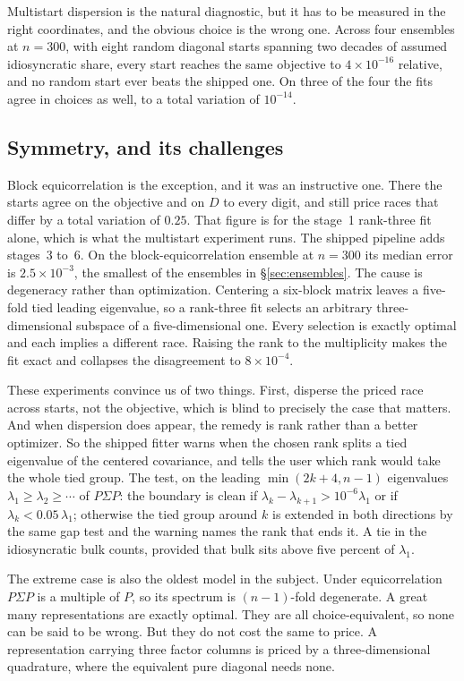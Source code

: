 \documentclass[11pt]{article}
\begin{document}
Multistart dispersion is the natural diagnostic, but it
has to be measured in the right coordinates, and the obvious choice is
the wrong one. Across four ensembles at $n=300$, with eight random diagonal starts
spanning two decades of assumed idiosyncratic share, every start reaches
the same objective to $4\times10^{-16}$ relative, and no random start
ever beats the shipped one. On three of the four the fits agree in
choices as well, to a total variation of $10^{-14}$.

\subsection{Symmetry, and its challenges}

Block equicorrelation is the exception, and it was an instructive one. There the
starts agree on the objective and on $D$ to every digit, and still price
races that differ by a total variation of $0.25$. That figure is for the
stage~1 rank-three fit alone, which is what the multistart experiment
runs. The shipped pipeline adds stages~3 to~6. On the
block-equicorrelation ensemble at $n=300$ its median error is
$2.5\times10^{-3}$, the smallest of the ensembles in
\S\ref{sec:ensembles}. The cause is degeneracy
rather than optimization. Centering a six-block matrix leaves a five-fold
tied leading eigenvalue, so a rank-three fit selects an arbitrary
three-dimensional subspace of a five-dimensional one. Every selection is
exactly optimal and each implies a different race. Raising the rank to
the multiplicity makes the fit exact and collapses the disagreement to
$8\times10^{-4}$.

These experiments convince us of two things. First, disperse the priced race across starts, not the objective, which is blind to precisely the case that matters. And when
dispersion does appear, the remedy is rank rather than a better
optimizer. So the shipped fitter warns when the chosen rank splits a tied
eigenvalue of the centered covariance, and tells the user which rank would take
the whole tied group. The test, on the leading $\min(2k+4,n-1)$
eigenvalues $\lambda_1\ge\lambda_2\ge\cdots$ of $P\Sigma P$: the boundary
is clean if $\lambda_k-\lambda_{k+1}>10^{-6}\lambda_1$ or if
$\lambda_k<0.05\,\lambda_1$; otherwise the tied group around $k$ is
extended in both directions by the same gap test and the warning names
the rank that ends it. A tie in the idiosyncratic bulk counts, provided
that bulk sits above five percent of $\lambda_1$.

The extreme case is also the oldest model in the subject. Under equicorrelation $P\Sigma P$ is a multiple of $P$, so its
spectrum is $(n-1)$-fold degenerate. A great many representations are
exactly optimal. They are all
choice-equivalent, so none can be said to be wrong. But they do not cost the same to
price. A representation carrying three factor columns is priced by a
three-dimensional quadrature, where the equivalent pure diagonal needs
none.
\end{document}

